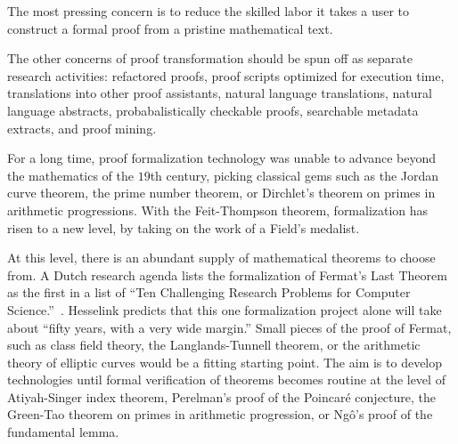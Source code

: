 \documentclass{llncs}
\begin{document}
%
The most pressing concern is to 
reduce the skilled labor it takes a user to construct a formal proof
from a pristine mathematical text.

The other concerns of proof transformation should be spun off as separate
research activities: refactored proofs,
proof scripts optimized for execution time, translations into other
proof assistants, natural language translations, natural language
abstracts, probabalistically checkable proofs, searchable metadata
extracts, and proof mining.


\bigskip

For a long time, proof formalization technology was unable to advance beyond
the mathematics
of the $19$th century, picking classical gems
such as the Jordan curve theorem, the prime number theorem, or
Dirchlet's theorem on primes in arithmetic progressions.  With
the Feit-Thompson theorem, formalization has risen
to a new level, by taking on the work of a Field's medalist.

At this level, there is an abundant supply of mathematical theorems to
choose from.  A Dutch research agenda 
lists the formalization of Fermat's Last Theorem as the first in a
list of ``Ten Challenging Research Problems for Computer
Science.''~\cite{Berg}.  Hesselink predicts that this one
formalization project alone will take about ``fifty years, with a very
wide margin.''
Small pieces of the proof of Fermat, such as class field theory, the
Langlands-Tunnell theorem, or the arithmetic theory of elliptic curves
would be a fitting starting point.  The aim is to develop
technologies until formal verification of theorems
becomes routine at the level of Atiyah-Singer index theorem,
Perelman's proof of the Poincar\'e conjecture, the Green-Tao theorem
on primes in arithmetic progression, or Ng\^o's proof of the
fundamental lemma.
\end{document}
